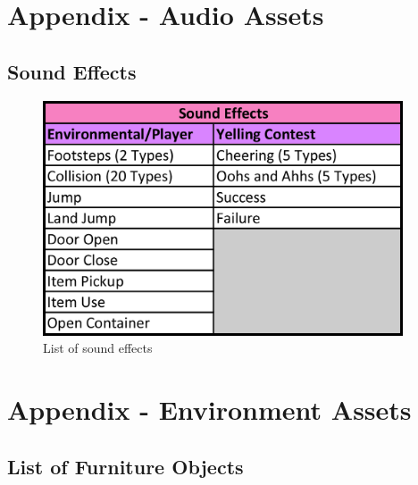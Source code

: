 \chapter{Appendix - Audio Assets}
\section{Sound Effects}

\begin{figure}[H]
\centering
  \caption{List of sound effects}
  \label{fig:sound_effects_list}
  \includegraphics[width=0.95\textwidth, height=0.5\paperheight, keepaspectratio=true]{images/table_sound_effects}
\end{figure}

\clearpage
\chapter{Appendix - Environment Assets}
\section{List of Furniture Objects}

